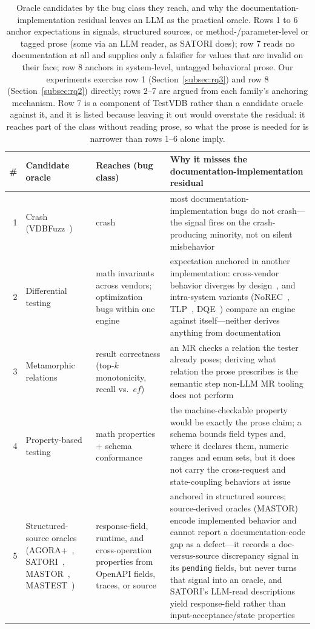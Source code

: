 \documentclass[acmsmall,screen,review,anonymous]{acmart}
\newcommand{\system}{TestVDB}
\begin{document}
\begin{table}[t]
\caption{Oracle candidates by the bug class they reach, and why the documentation-implementation residual leaves an LLM as the practical oracle. Rows 1 to 6 anchor expectations in signals, structured sources, or method-/parameter-level or tagged prose (some via an LLM reader, as SATORI does); row 7 reads no documentation at all and supplies only a falsifier for values that are invalid on their face; row 8 anchors in system-level, untagged behavioral prose. Our experiments exercise row 1 (Section~\ref{subsec:rq3}) and row 8 (Section~\ref{subsec:rq2}) directly; rows 2--7 are argued from each family's anchoring mechanism. Row 7 is a component of \system{} rather than a candidate oracle against it, and it is listed because leaving it out would overstate the residual: it reaches part of the class without reading prose, so what the prose is needed for is narrower than rows 1--6 alone imply.}
\label{tab:exclusion}
\small
\begin{tabular}{@{}rp{}p{}p{}@{}}
\toprule
\# & Candidate oracle & Reaches (bug class) & Why it misses the documentation-implementation residual \\
\midrule
1 & Crash (VDBFuzz~\cite{vdbfuzz26}) & crash & most documentation-implementation bugs do not crash---the signal fires on the crash-producing minority, not on silent misbehavior \\
2 & Differential testing & math invariants across vendors; optimization bugs within one engine & expectation anchored in another implementation: cross-vendor behavior diverges by design~\cite{roadmap25}, and intra-system variants (NoREC~\cite{norec20}, TLP~\cite{tlp20}, DQE~\cite{dqe23}) compare an engine against itself---neither derives anything from documentation \\
3 & Metamorphic relations~\cite{metmap24,armeta26} & result correctness (top-$k$ monotonicity, recall vs.\ $ef$) & an MR checks a relation the tester already poses; deriving what relation the prose prescribes is the semantic step non-LLM MR tooling does not perform \\
4 & Property-based testing~\cite{claessen00,schemathesis,quickrest20} & math properties + schema conformance & the machine-checkable property would be exactly the prose claim; a schema bounds field types and, where it declares them, numeric ranges and enum sets, but it does not carry the cross-request and state-coupling behaviors at issue \\
5 & Structured-source oracles (AGORA+~\cite{agoraplus25}, SATORI~\cite{satori25}, MASTOR~\cite{mastor26}, MASTEST~\cite{mastest26}) & response-field, runtime, and cross-operation properties from OpenAPI fields, traces, or source & anchored in structured sources; source-derived oracles (MASTOR) encode implemented behavior and cannot report a documentation-code gap as a defect---it records a doc-versus-source discrepancy signal in its \texttt{pending} fields, but never turns that signal into an oracle, and SATORI's LLM-read descriptions yield response-field rather than input-acceptance/state properties \\

\end{tabular}
\end{table}
\end{document}

